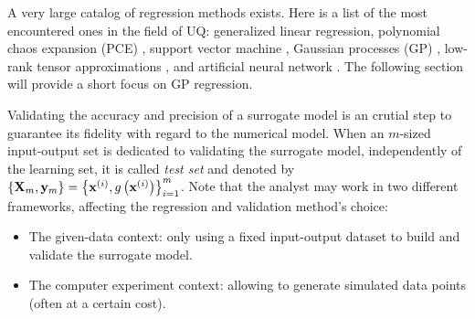 A very large catalog of regression methods exists. 
Here is a list of the most encountered ones in the field of UQ:
generalized linear regression, polynomial chaos expansion (PCE) \citep{soize_2004, blatman_2011}, support vector machine \citep{vapnik_1995}, 
Gaussian processes (GP) \citep{rasmussen_2006}, low-rank tensor approximations \citep{grasedyck_2013}, and artificial neural network \citep{tibshirani_2009}.
The following section will provide a short focus on GP regression. %

Validating the accuracy and precision of a surrogate model is an crutial step to guarantee its fidelity with regard to the numerical model. 
When an $m$-sized input-output set is dedicated to validating the surrogate model, independently of the learning set, 
it is called \textit{test set} and denoted by $\left\{{\bf X}_m, {\bf y}_m\right\} = \left\{{\bf x}^{(i)}, g\left({\bf x}^{(i)}\right)\right\}_{i=1}^m$. 
Note that the analyst may work in two different frameworks, affecting the regression and validation method's choice: 
\begin{itemize}
    \item The given-data context: only using a fixed input-output dataset to build and validate the surrogate model. 
    \item The computer experiment context: allowing to generate simulated data points (often at a certain cost).
\end{itemize}

